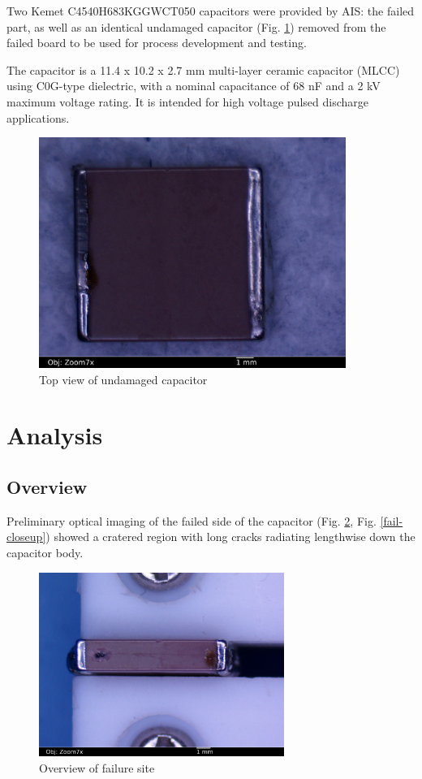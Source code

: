 \documentclass{article}
\begin{document}
Two Kemet C4540H683KGGWCT050 capacitors were provided by AIS: the failed part, as well as an identical undamaged
capacitor (Fig. \ref{overview}) removed from the failed board to be used for process development and testing.

The capacitor is a 11.4 x 10.2 x 2.7 mm multi-layer ceramic capacitor (MLCC) using C0G-type dielectric, with a nominal
capacitance of 68 nF and a 2 kV maximum voltage rating. It is intended for high voltage pulsed discharge applications.

\begin{figure}[h]
\includegraphics[width=10cm,keepaspectratio]{01-goodcap-top_annotated.jpg}
\caption{Top view of undamaged capacitor}
\label{overview}
\end{figure}

\pagebreak
\section{Analysis}

\subsection{Overview}

Preliminary optical imaging of the failed side of the capacitor (Fig. \ref{fail-overview}, Fig. \ref{fail-closeup})
showed a cratered region with long cracks radiating lengthwise down the capacitor body.

\begin{figure}[h]
\includegraphics[width=8cm,keepaspectratio]{02-badcap-side_annotated.jpg}
\caption{Overview of failure site}
\label{fail-overview}
\end{figure}
\end{document}
